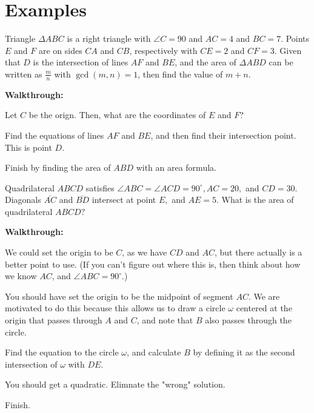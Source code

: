\documentclass[11pt]{scrartcl}
\begin{document}
\section{Examples}
\begin{example}[MATHCOUNTS 2008]
Triangle $\Delta ABC$ is a right triangle with $\angle C = 90$ and $AC=4$ and $BC = 7$. Points $E$ and $F$ are on sides $CA$ and $CB$, respectively with $CE=2$ and $CF=3$. Given that $D$ is the intersection of lines $AF$ and $BE$, and the area of $\Delta ABD$ can be written as $\frac{m}{n}$ with $\gcd(m,n)=1$, then find the value of $m+n$.
\end{example}
\textbf{Walkthrough:}
\begin{walk}


	\item Let $C$ be the orign. Then, what are the coordinates of $E$ and $F$?
	\item Find the equations of lines $AF$ and $BE$, and then find their intersection point. This is point $D$. 
	\item Finish by finding the area of $ABD$ with an area formula. 


\end{walk}

\begin{example}[AMC 10A 2020/20]
Quadrilateral $ABCD$ satisfies $\angle ABC = \angle ACD = 90^{\circ}, AC=20,$ and $CD=30.$ Diagonals $\overline{AC}$ and $\overline{BD}$ intersect at point $E,$ and $AE=5.$ What is the area of quadrilateral $ABCD?$
\end{example}

\textbf{Walkthrough:}
\begin{walk}
    \item We could set the origin to be $C$, as we have $CD$ and $AC$, but there actually is a better point to use. (If you can't figure out where this is, then think about how we know $AC$, and $\angle ABC=90^{\circ}$.)
    
    You should have set the origin to be the midpoint of segment $AC$. We are motivated to do this because this allows us to draw a circle $\omega$ centered at the origin that passes through $A$ and $C$, and note that $B$ also passes through the circle.
    
    \item Find the equation to the circle $\omega$, and calculate $B$ by defining it as the second intersection of $\omega$ with $DE$. 
    \item You should get a quadratic. Elimnate the "wrong" solution.
    \item Finish. 


\end{walk}
\end{document}
